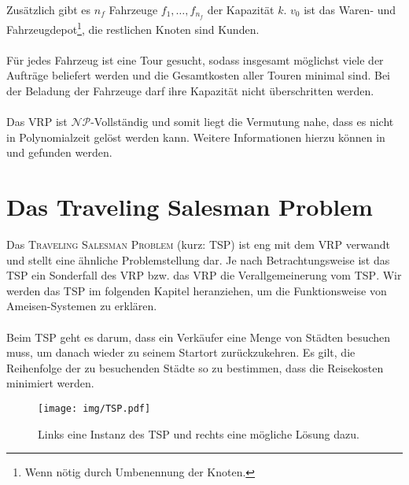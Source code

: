 \noindent
Zusätzlich gibt es $n_f$ Fahrzeuge $f_1, \ldots, f_{n_f}$ der Kapazität $k$. $v_0$ ist das Waren- und Fahrzeugdepot\footnote{Wenn nötig durch Umbenennung der Knoten.}, die restlichen Knoten sind Kunden. \\
\\
Für jedes Fahrzeug ist eine Tour gesucht, sodass insgesamt möglichst viele der Aufträge beliefert werden und die Gesamtkosten aller Touren minimal sind. Bei der Beladung der Fahrzeuge darf ihre Kapazität nicht überschritten werden. \\
\\
Das \textsc{VRP} ist $\mathcal{NP}$-Vollständig und somit liegt die Vermutung nahe, dass es nicht in Polynomialzeit gelöst werden kann. Weitere Informationen hierzu können in \cite{GJ} und \cite{TSP} gefunden werden.


\section{Das Traveling Salesman Problem}\label{chp:tsp}
Das \textsc{Traveling Salesman Problem} (kurz: \textsc{TSP}) ist eng mit dem \textsc{VRP} verwandt und stellt eine ähnliche Problemstellung dar. Je nach Betrachtungsweise ist das \textsc{TSP} ein Sonderfall des \textsc{VRP} bzw. das \textsc{VRP} die Verallgemeinerung vom \textsc{TSP}. Wir werden das \textsc{TSP} im folgenden Kapitel heranziehen, um die Funktionsweise von Ameisen-Systemen zu erklären. \\
\\
Beim \textsc{TSP} geht es darum, dass ein Verkäufer eine Menge von Städten besuchen muss, um danach wieder zu seinem Startort zurückzukehren. Es gilt, die Reihenfolge der zu besuchenden Städte so zu bestimmen, dass die Reisekosten minimiert werden. \\

\begin{wrapfigure}{r}{0.6\textwidth}
  \vspace{-20pt}
  \begin{center}
    \texttt{[image: img/TSP.pdf]}
  \end{center}
  \vspace{-20pt}
  \caption[Beispiel: \textsc{TSP}]{Links eine Instanz des \textsc{TSP} und rechts eine mögliche Lösung dazu.}
  \vspace{-5pt}
  \label{fig:tsp}
\end{wrapfigure}

